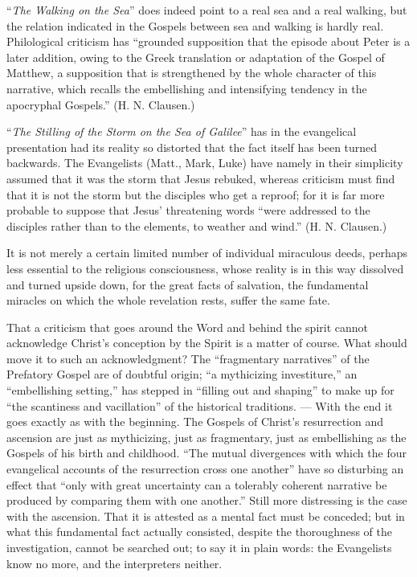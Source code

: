 \documentclass[12pt,a4paper,openany]{book}
\newcommand{\opage}[1]{\marginnote{\footnotesize\textit{[#1]}}}
\begin{document}
``\emph{The Walking on the Sea}'' does indeed point to
a real sea and a real walking, but the relation indicated in the Gospels
between sea and walking is
hardly real. Philological criticism has ``grounded
supposition that the episode about Peter is a later addition,
owing to the Greek translation or adaptation
of the Gospel of Matthew, a supposition that is
strengthened by the whole character of this narrative, which
recalls the embellishing and intensifying tendency in
the apocryphal Gospels.'' (H. N. Clausen.)

``\emph{The Stilling of the Storm on the Sea of Galilee}''
has in the evangelical presentation had its
reality so distorted that the fact itself has been
turned backwards. The Evangelists (Matt., Mark, Luke) have
\setcounter{footnote}{0}%
\opage{21}namely in their simplicity assumed that it was the storm
that Jesus rebuked, whereas criticism must find that
it is not the storm but the disciples who get a reproof;
for it is far more probable to suppose that Jesus' threatening
words ``were addressed to the disciples rather than to the elements,
to weather and wind.'' (H. N. Clausen.)

It is not merely a certain limited number of individual miraculous deeds,
perhaps less essential to the religious consciousness,
whose reality is in this way
dissolved and turned upside down, for the great facts of salvation,
the fundamental miracles on which the whole revelation
rests, suffer the same fate.

That a criticism that goes around the Word and behind
the spirit cannot acknowledge Christ's conception by the Spirit
is a matter of course. What should move it to
such an acknowledgment? The ``fragmentary
narratives'' of the Prefatory Gospel are of doubtful origin; ``a mythicizing
investiture,'' an ``embellishing setting,'' has
stepped in ``filling out and shaping'' to make up for ``the
scantiness and vacillation'' of the historical traditions.
--- With the end it goes exactly as with the beginning.
The Gospels of Christ's resurrection and ascension
are just as mythicizing, just as fragmentary,
just as embellishing as the Gospels of his birth
and childhood. ``The mutual divergences with which the
four evangelical accounts of the resurrection cross one another'' have so disturbing an effect that ``only
with great uncertainty can a tolerably coherent
narrative be produced by comparing them with one another.''
Still more distressing is the case
with the ascension. That it is attested as a
\setcounter{footnote}{0}%
\opage{22}mental fact must be conceded; but in what this fundamental fact
actually consisted, despite the thoroughness of the investigation,
cannot be searched out; to say it in plain words: the Evangelists
know no more, and the interpreters neither.
\end{document}
